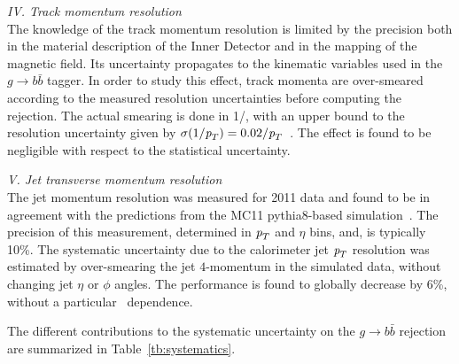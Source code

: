 \vspace{3mm}
{\em IV. Track momentum resolution}
\\[3mm]
The knowledge of the track momentum resolution is limited by the precision both in the material description of the Inner Detector and in the mapping of the magnetic field. Its uncertainty propagates to the kinematic variables used in the 
$g\rightarrow b \bar{b}$ tagger. In order to study this effect, track momenta are over-smeared according to the measured resolution uncertainties before computing the rejection. The actual smearing is done in 1/\pt, with an upper bound to the resolution uncertainty given by $\sigma(1/{\emph{p}_{T}})=0.02/{\emph{p}_{T}}$~\cite{ATLAS-CONF-2010-009}. The effect is found to be negligible with respect to the statistical uncertainty.

\vspace{3mm}
{ \em V. Jet transverse momentum resolution}
\\[3mm]
The jet momentum resolution was measured for 2011 data and found to be in agreement with the predictions from the MC11 {\sc pythia8}-based simulation~\cite{JER2011}. The precision of this measurement, determined in ${\emph{p}_{T}}$ and $\eta$ bins, and, is typically 10\%.
The systematic uncertainty due to the calorimeter jet ${\emph{p}_{T}}$ resolution was estimated by over-smearing the jet $4$-momentum in the simulated data, without changing jet $\eta$ or $\phi$ angles. The performance is found to globally decrease by 6\%, without a particular \pt\ dependence.

\vspace{3mm}
The different contributions to the systematic uncertainty on the $g\rightarrow b \bar{b}$ rejection are summarized in Table~\ref{tb:systematics}.




